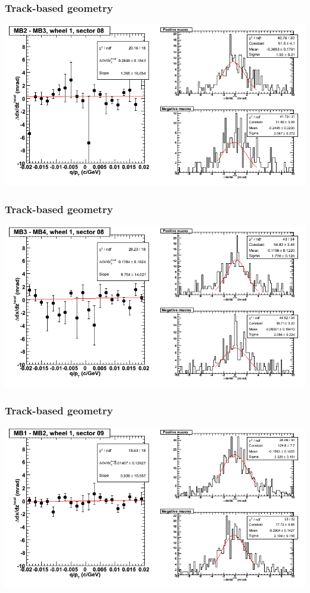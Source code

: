 \documentclass[compress]{beamer}
\begin{document}
\begin{frame}
\frametitle{Track-based geometry}
\includegraphics[width=\linewidth]{NOV4_segdiffs/dt13_slope_D_08_23.png}
\end{frame}

\begin{frame}
\frametitle{Track-based geometry}
\includegraphics[width=\linewidth]{NOV4_segdiffs/dt13_slope_D_08_34.png}
\end{frame}

\begin{frame}
\frametitle{Track-based geometry}
\includegraphics[width=\linewidth]{NOV4_segdiffs/dt13_slope_D_09_12.png}
\end{frame}
\end{document}

